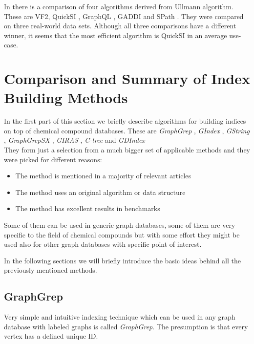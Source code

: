 In \cite{Lee} there is a comparison of four algorithms derived from Ullmann algorithm. These are VF2, QuickSI \cite{QuickSI}, GraphQL \cite{GraphQL}, GADDI \cite{GADDI} and SPath \cite{SPath}. They were compared on three real-world data sets. Although all three comparisons have a different winner, it seems that the most efficient algorithm is QuickSI in an average use-case.

\section{Comparison and Summary of Index Building Methods}

In the first part of this section we briefly describe algorithms for building indices on top of chemical compound databases. These are \textit{GraphGrep} \cite{GraphGrep}\cite{GrahGrep:intro}, \textit{GIndex} \cite{GIndex}, \textit{GString} \cite{GString}, \textit{GraphGrepSX} \cite{GraphGrepSX}, \textit{GIRAS} \cite{GIRAS}, \textit{C-tree} \cite{CTree} and \textit{GDIndex} \cite{GDIndex}\\

They form just a selection from a much bigger set of applicable methods and they were picked for different reasons:

\begin{itemize}
	\item The method is mentioned in a majority of relevant articles
	\item The method uses an original algorithm or data structure
	\item The method has excellent results in benchmarks
\end{itemize}

Some of them can be used in generic graph databases, some of them are very specific to the field of chemical compounds but with some effort they might be used also for other graph databases with specific point of interest.

In the following sections we will briefly introduce the basic ideas behind all the previously mentioned methods.

\subsection{GraphGrep}

Very simple and intuitive indexing technique which can be used in any graph database with labeled graphs is called \textit{GraphGrep}. The presumption is that every vertex has a defined unique ID.\\

